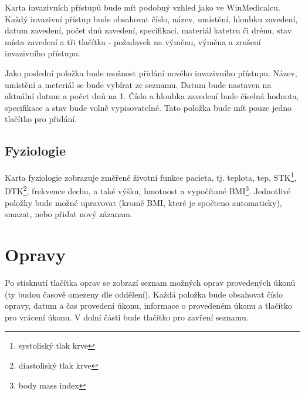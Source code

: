 Karta invazivních přístupů bude mít podobný vzhled jako ve WinMedicalcu. Každý invazivní přístup bude obsahovat číslo, název, umístění, hloubku zavedení, datum zavedení, počet dnů zavedení, specifikaci, materiál katetru či drénu, stav místa zavedení a tři tlačítka - požadavek na výměnu, výměna a zrušení invazivního přístupu.

Jako poslední položka bude možnost přidání nového invazivního přístupu. Název, umístění a meteriál se bude vybírat ze seznamu. Datum bude nastaven na aktuální datum a počet dnů na 1. Číslo a hloubka zavedení bude číselná hodnota, specifikace a stav bude volně vypisovatelné. Tato položka bude mít pouze jedno tlačítko pro přidání.

\subsection{Fyziologie}

Karta fyziologie zobrazuje změřené životní funkce pacieta, tj. teplota, tep, STK\footnote{systoliský tlak krve}, DTK\footnote{diastoliský tlak krve}, frekvence dechu, a také výšku, hmotnost a vypočítané BMI\footnote{body mass index}. Jednotlivé položky bude možné upravovat (kromě BMI, které je spočteno automaticky), smazat, nebo přidat nový zázanam.

\section{Opravy}

Po stisknutí tlačítka oprav se zobrazí seznam možných oprav provedených úkonů (ty budou časově omezeny dle oddělení). Každá položka bude obsahovat číslo opravy, datum a čas provedení úkonu, informace o provedeném úkonu a tlačítko pro vrácení úkonu. V dolní části bude tlačítko pro zavření seznamu.